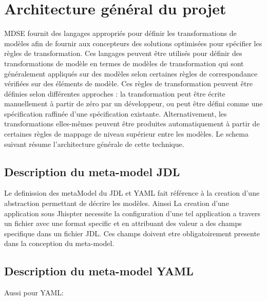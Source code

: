 \section{Architecture général du projet}

MDSE fournit des langages appropriés pour définir les transformations de
modèles afin de fournir aux concepteurs des solutions optimisées pour
spécifier les règles de transformation. Ces langages peuvent être
utilisés pour définir des transformations de modèle en termes de modèles
de transformation qui sont généralement appliqués sur des modèles selon
certaines règles de correspondance vérifiées sur des éléments de modèle.
Ces règles de transformation peuvent être définies selon différentes
approches : la transformation peut être écrite manuellement à partir de
zéro par un développeur, ou peut être défini comme une spécification
raffinée d'une spécification existante. Alternativement, les
transformations elles-mêmes peuvent être produites automatiquement à
partir de certaines règles de mappage de niveau supérieur entre les
modèles. Le schema suivant résume l'architecture générale de cette
technique.

\subsection{Description du meta-model JDL}
Le definission des metaModel du JDL et YAML fait référence à la creation
d'une abstraction permettant de décrire les modèles. Ainssi La creation d'une application sous Jhispter necessite la configuration 
d'une tel application a travers un fichier avec une format specific et
en attribuant des valeur a des champs specifique dans un fichier JDL. 
Ces champs doivent etre obligatoirement presente dans la conception
du meta-model. 

\subsection{Description du meta-model YAML}

Aussi pour YAML:\\
\begin{figure}[H]
  \begin{center}
      \caption{}
  \end{center}
\end{figure}